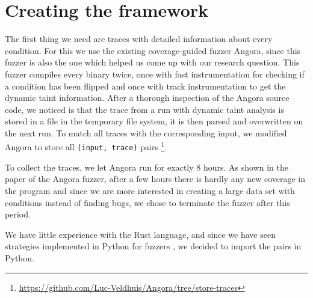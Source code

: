 \begin{comment}
  \draw[->] (AngoraFuzzer) to (GeneratedInputs);
  \draw[->] (AngoraFuzzer) to (TrackFiles);
  
  \draw[->] (TrackFiles) to (TrackFileParser);
  \draw[->] (TrackFileParser) to (ParsedTrackFiles);
  
  \draw[->] (ParsedTrackFiles) to[in=180,out=0] (FuzzChecker);
  \draw[->] (GeneratedInputs) to (FuzzChecker);
  \draw[->] (FuzzCheckerCompiled) to (FuzzChecker);
  \draw[->] (SymccCompiled) to (FuzzChecker);
  
  \draw[->] (FuzzChecker) to (OutputInformation);
  \draw[->] (OutputInformation) to (OutputParser);
  \draw[->] (OutputParser) to (CSV);
  
  
  
    \end{tikzpicture}
    \caption{General overview of the architecture of the framework}
    \label{fig:generalImplement}
\end{figure}
\end{comment}
\section{Creating the framework}
The first thing we need are traces with detailed information about every condition. For this we use the existing coverage-guided fuzzer Angora, since this fuzzer is also the one which helped us come up with our research question. This fuzzer compiles every binary twice, once with fast instrumentation for checking if a condition has been flipped and once with track instrumentation to get the dynamic taint information.
After a thorough inspection of the Angora source code, we noticed is that the trace from a run with dynamic taint analysis is stored in a file in the temporary file system, it is then parsed and overwritten on the next run. To match all traces with the corresponding input, we modified Angora to store all \texttt{(input, trace)} pairs \footnote{\url{https://github.com/Luc-Veldhuis/Angora/tree/store-traces}}.

To collect the traces, we let Angora run for exactly 8 hours. As shown in the paper of the Angora fuzzer, after a few hours there is hardly any new coverage in the program and since we are more interested in creating a large data set with conditions instead of finding bugs, we chose to terminate the fuzzer after this period. 

We have little experience with the Rust language, and since we have seen strategies implemented in Python for fuzzers \cite{schumilo2017kafl, aschermann2019redqueen, she2019neuzz}, we decided to import the pairs in Python.

